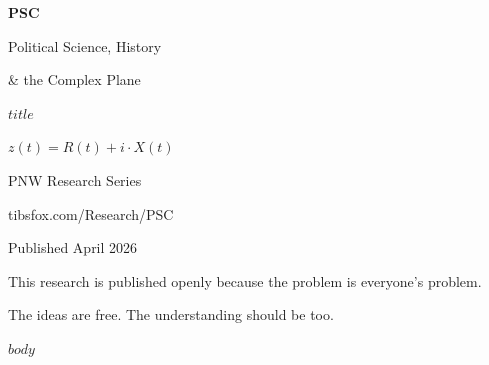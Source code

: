\documentclass[11pt,a4paper]{article}
\begin{document}
\begin{titlepage}
\centering
\vspace*{3cm}
{\Huge\bfseries\sffamily\color{pscaccent} PSC\par}
\vspace{0.5cm}
{\LARGE\sffamily Political Science, History\par \& the Complex Plane\par}
\vspace{1cm}
{\Large\sffamily\color{pscformula} $title$\par}
\vspace{0.5cm}
{\normalsize\sffamily\color{pscmuted} \ensuremath{z(t) = R(t) + i \cdot X(t)}\par}
\vspace{2cm}
{\large\sffamily PNW Research Series\par}
{\normalsize\sffamily tibsfox.com/Research/PSC\par}
\vspace{1cm}
{\normalsize\sffamily\color{pscmuted} Published April 2026\par}
\vfill
{\small\sffamily\color{pscmuted} This research is published openly because the problem is everyone's problem.\par
The ideas are free. The understanding should be too.\par}
\end{titlepage}

$body$
\end{document}
